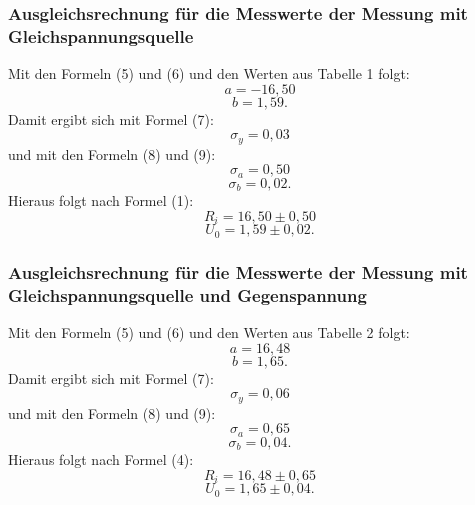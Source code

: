 \subsubsection{Ausgleichsrechnung für die Messwerte der Messung mit Gleichspannungsquelle}
Mit den Formeln (5) und (6) und den Werten aus Tabelle 1 folgt:
\begin{displaymath}
	a=-16,50
\end{displaymath}
\begin{displaymath}
	b=1,59\text{.}
\end{displaymath}
Damit ergibt sich mit Formel (7):
\begin{displaymath}
	\sigma_y=0,03
\end{displaymath}
und mit den Formeln (8) und (9):
\begin{displaymath}
	\sigma_a=0,50
\end{displaymath}
\begin{displaymath}
	\sigma_b=0,02\text{.}
\end{displaymath}
Hieraus folgt nach Formel (1):
\begin{displaymath}
	R_i=16,50\pm 0,50
\end{displaymath}
\begin{displaymath}
	U_0=1,59\pm 0,02\text{.}
\end{displaymath}

\subsubsection{Ausgleichsrechnung für die Messwerte der Messung mit Gleichspannungsquelle und Gegenspannung}

Mit den Formeln (5) und (6) und den Werten aus Tabelle 2 folgt:
\begin{displaymath}
a=16,48
\end{displaymath}
\begin{displaymath}
b=1,65\text{.}
\end{displaymath}
Damit ergibt sich mit Formel (7):
\begin{displaymath}
\sigma_y=0,06
\end{displaymath}
und mit den Formeln (8) und (9):
\begin{displaymath}
\sigma_a=0,65
\end{displaymath}
\begin{displaymath}
\sigma_b=0,04\text{.}
\end{displaymath}
Hieraus folgt nach Formel (4):
\begin{displaymath}
R_i=16,48\pm 0,65
\end{displaymath}
\begin{displaymath}
U_0=1,65\pm 0,04\text{.}
\end{displaymath}

